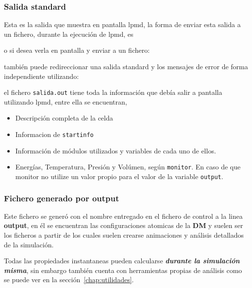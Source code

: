 \subsubsection{Salida standard}
Esta es la salida que muestra en pantalla lpmd, la forma de enviar esta salida a un fichero, durante la ejecuci\'on de lpmd, es


o si desea verla en pantalla y enviar a un fichero:


tambi\'en puede redireccionar una salida standard y los mensajes de error de forma independiente utilizando:


el fichero \verb|salida.out| tiene toda la informaci\'on que deb\'ia salir a pantalla utilizando lpmd, entre ella se encuentran,

\begin{itemize}
 \item Descripci\'on completa de la celda
 \item Informacion de \verb|startinfo|
 \item Informaci\'on de m\'odulos utilizados y variables de cada uno de ellos.
 \item Energ\'ias, Temperatura, Presi\'on y Vol\'umen, seg\'un \verb|monitor|. En caso de que monitor no utilize un valor propio para el valor de la variable \verb|output|.
\end{itemize}


\subsubsection{Fichero generado por output}
Este fichero se gener\'o con el nombre entregado en el fichero de control a la linea \textbf{output}, en \'el se encuentran las configuraciones atomicas de la \textbf{DM} y suelen ser los ficheros a partir de los cuales suelen crearse animaciones y an\'alisis detallados de la simulaci\'on.

Todas las propiedades instantaneas pueden calcularse \textit{\textbf{durante la simulaci\'on misma}}, sin embargo {\lpmd} tambi\'en cuenta con herramientas propias de an\'alisis como se puede ver en la secci\'on~\ref{chap:utilidades}.

